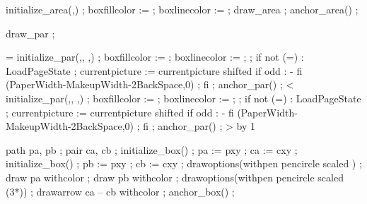   initialize_area(,) ;
  boxfillcolor :=  ;
  boxlinecolor :=  ;
  draw_area ;
  anchor_area() ;
\stopMPpositiongraphic


  draw_par ;
\stopuseMPgraphic

  \ifnum{}=\relax
      initialize_par(,,
                     ,) ;
      boxfillcolor :=  ;
      boxlinecolor :=  ;
       ;
if not (=) :
  LoadPageState ; currentpicture := currentpicture shifted 
  if odd \realfolio : - fi (PaperWidth-MakeupWidth-2BackSpace,0) ; 
fi ; 
      anchor_par() ;
    \stopMPpositiongraphic
  \else\ifnum{}<\relax
      initialize_par(,,
                     ,) ;
      boxfillcolor :=  ;
      boxlinecolor :=  ;
       ;
if not (=) :
  LoadPageState ; currentpicture := currentpicture shifted 
  if odd \realfolio : - fi (PaperWidth-MakeupWidth-2BackSpace,0) ; 
fi ; 
      anchor_par() ;
    \stopMPpositiongraphic
    \ifnum{}>\realpageno
      \bgroup
      \advance\realpageno by 1
      \egroup
    \fi
  \fi\fi
\stopMPpositionmethod



  path pa, pb ; pair ca, cb ;
  initialize_box() ; pa := pxy ; ca := cxy ;
  initialize_box() ; pb := pxy ; cb := cxy ;
  drawoptions(withpen pencircle scaled ) ;
  draw pa withcolor  ;
  draw pb withcolor  ;
  drawoptions(withpen pencircle scaled (3*)) ;
  drawarrow ca -- cb withcolor  ;
  anchor_box() ;
\stopMPpositiongraphic


